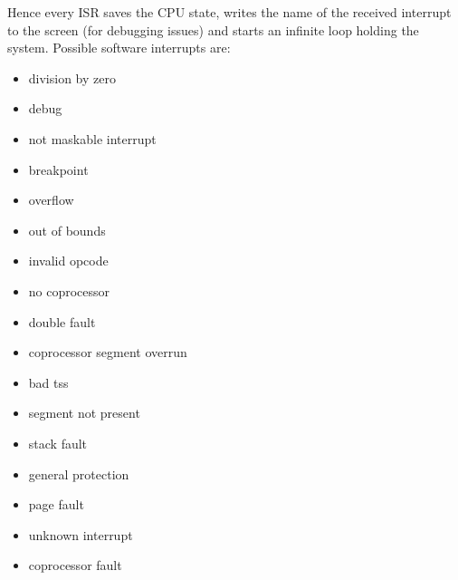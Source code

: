 \documentclass[11pt,a4paper]{scrartcl}
\begin{document}
Hence every ISR saves the CPU state, writes the name of the received interrupt to the screen (for debugging issues) and starts an infinite loop holding the system. Possible software interrupts are:
\begin{itemize}
\item division by zero
\item debug
\item not maskable interrupt
\item breakpoint
\item overflow
\item out of bounds
\item invalid opcode
\item no coprocessor
\item double fault
\item coprocessor segment overrun
\item bad tss
\item segment not present
\item stack fault
\item general protection
\item page fault
\item unknown interrupt
\item coprocessor fault
\end{itemize}
\end{document}
